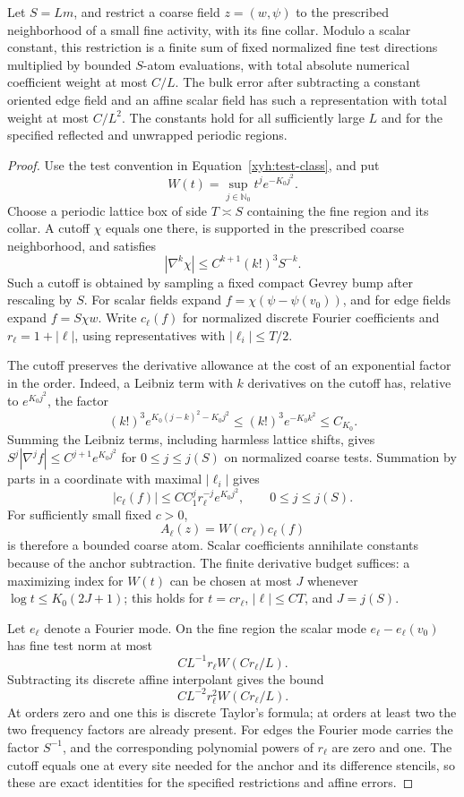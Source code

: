 \begin{lemma}\label{xyh:fourier}
Let $S=Lm$, and restrict a coarse field $z=(w,\psi)$ to the
prescribed neighborhood of a small fine activity, with its fine
collar. Modulo a scalar constant, this restriction is a finite sum
of fixed normalized fine test directions multiplied by bounded
$S$-atom evaluations, with total absolute numerical coefficient
weight at most $C/L$. The bulk error after subtracting a constant
oriented edge field and an affine scalar field has such a
representation with total weight at most $C/L^2$.
The constants hold for all sufficiently large $L$ and for the
specified reflected and unwrapped periodic regions.
\end{lemma}
\begin{proof}
Use the test convention in Equation~\eqref{xyh:test-class}, and put
\[
 W(t)=\sup_{j\in\mathbb N_0}t^j e^{-K_0j^2}.
\]
Choose a periodic lattice box of side $T\asymp S$ containing the
fine region and its collar. A cutoff $\chi$ equals one there, is
supported in the prescribed coarse neighborhood, and satisfies
\[
 |\nabla^k\chi|\le C^{k+1}(k!)^3S^{-k}.
\]
Such a cutoff is obtained by sampling a fixed compact Gevrey bump
after rescaling by $S$. For scalar fields expand
$f=\chi(\psi-\psi(v_0))$, and for edge fields expand $f=S\chi w$.
Write $c_\ell(f)$ for normalized discrete Fourier coefficients and
$r_\ell=1+|\ell|$, using representatives with $|\ell_i|\le T/2$.

The cutoff preserves the derivative allowance at the cost of an
exponential factor in the order. Indeed, a Leibniz term with $k$
derivatives on the cutoff has, relative to $e^{K_0j^2}$, the factor
\[
 (k!)^3 e^{K_0(j-k)^2-K_0j^2}
 \le (k!)^3e^{-K_0k^2}\le C_{K_0}.
\]
Summing the Leibniz terms, including harmless lattice shifts, gives
$S^j|\nabla^jf|\le C^{j+1}e^{K_0j^2}$ for $0\le j\le j(S)$
on normalized coarse tests. Summation by parts in a coordinate
with maximal $|\ell_i|$ gives
\[
 |c_\ell(f)|\le C C_1^j r_\ell^{-j}e^{K_0j^2},
 \qquad 0\le j\le j(S).
\]
For sufficiently small fixed $c>0$,
\[
 A_\ell(z)=W(cr_\ell)c_\ell(f)
\]
is therefore a bounded coarse atom. Scalar coefficients annihilate
constants because of the anchor subtraction. The finite derivative
budget suffices: a maximizing index for $W(t)$ can be chosen at most
$J$ whenever $\log t\le K_0(2J+1)$; this holds for $t=cr_\ell$,
$|\ell|\le CT$, and $J=j(S)$.

Let $e_\ell$ denote a Fourier mode. On the fine region the scalar
mode $e_\ell-e_\ell(v_0)$ has fine test norm at most
\[
 C L^{-1}r_\ell W(Cr_\ell/L).
\]
Subtracting its discrete affine interpolant gives the bound
\[
 C L^{-2}r_\ell^2W(Cr_\ell/L).
\]
At orders zero and one this is discrete Taylor's formula; at orders
at least two the two frequency factors are already present.
For edges the Fourier mode carries the factor $S^{-1}$, and the
corresponding polynomial powers of $r_\ell$ are zero and one.
The cutoff equals one at every site needed for the anchor and
its difference stencils, so these are exact identities for the
specified restrictions and affine errors.


\end{proof}
